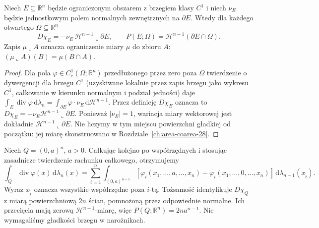 \begin{twierdzenie}
\label{thm:smooth-perimeter-29}
Niech $E\subseteq\mathbb R^n$ będzie ograniczonym
obszarem z brzegiem klasy $C^1$ i niech
$\nu_E$ będzie jednostkowym polem normalnych
zewnętrznych na $\partial E$. Wtedy dla każdego
otwartego $\Omega\subseteq\mathbb R^n$
\[
 D\chi_E=-\nu_E\,\mathcal H^{n-1}\llcorner\partial E,
 \qquad P(E;\Omega)=\mathcal H^{n-1}(\partial E\cap\Omega).
\]
Zapis $\mu\llcorner A$ oznacza ograniczenie miary
$\mu$ do zbioru $A$: $(\mu\llcorner A)(B)=\mu(B\cap A)$.
\end{twierdzenie}
\begin{proof}
Dla pola $\varphi\in C_c^1(\Omega;\mathbb R^n)$
przedłużonego przez zero poza $\Omega$ twierdzenie
o dywergencji dla brzegu $C^1$ (uzyskiwane lokalnie
przez zapis brzegu jako wykresu $C^1$, całkowanie
w kierunku normalnym i podział jedności) daje
$\int_E\operatorname{div}\varphi
\,\mathrm d\lambda_n
=\int_{\partial E}\varphi\cdot\nu_E
\,\mathrm d\mathcal H^{n-1}$.
Przez definicję $D\chi_E$ oznacza to
$D\chi_E=-\nu_E\mathcal H^{n-1}\llcorner\partial E$.
Ponieważ $|\nu_E|=1$, wariacja miary wektorowej
jest dokładnie $\mathcal H^{n-1}\llcorner\partial E$.
Nie liczymy w tym miejscu powierzchni gładkiej
od początku: jej miarę skonstruowano w
Rozdziale~\ref{ch:area-coarea-28}.
\end{proof}

\begin{przyklad}
\label{ex:cube-perimeter-29}
Niech $Q=(0,a)^n$, $a>0$. Całkując kolejno po
współrzędnych i stosując zasadnicze twierdzenie
rachunku całkowego, otrzymujemy
\[
 \int_Q\operatorname{div}\varphi(x)\,\mathrm d\lambda_n(x)
 =\sum_{i=1}^n\int_{(0,a)^{n-1}}
 [\varphi_i(x_1,\ldots,a,\ldots,x_n)-
  \varphi_i(x_1,\ldots,0,\ldots,x_n)]
 \,\mathrm d\lambda_{n-1}(x_{\widehat i}).
\]
Wyraz $x_{\widehat i}$ oznacza wszystkie współrzędne
poza $i$-tą. Tożsamość identyfikuje
$D\chi_Q$ z miarą powierzchniową $2n$ ścian,
pomnożoną przez odpowiednie normalne. Ich
przecięcia mają zerową $\mathcal H^{n-1}$-miarę,
więc $P(Q;\mathbb R^n)=2na^{n-1}$.
Nie wymagaliśmy gładkości brzegu w narożnikach.
\end{przyklad}

